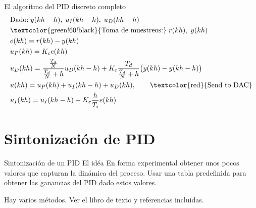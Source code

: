 \documentclass[presentation,aspectratio=1610]{beamer}
\begin{document}
\begin{frame}[label={sec:org34749bc}]{El algoritmo del PID discreto completo}
\begin{align*}
&\text{Dado:}  \;  y(kh-h), \; u_I(kh-h), \; u_D(kh-h)\\
& \text{\textcolor{green!60!black}{Toma de muestreos:}} \; r(kh), \; y(kh)\\
&e(kh) = r(kh) - y(kh)\\
&u_P(kh) = K_ce(kh)\\
&u_D(kh) = \frac{\frac{T_d}{N}}{\frac{T_d}{N} + h}u_D(kh-h) + K_c\frac{T_d}{\frac{T_d}{N} + h}\big(y(kh) - y(kh-h)\big)\\
&u(kh) = u_P(kh) + u_I(kh-h) + u_D(kh), \qquad \text{\textcolor{red}{Send to DAC}}\\
&u_I(kh) = u_I(kh-h) + K_c \frac{h}{T_i} e(kh)
\end{align*}

\begin{center}
\end{center}
\end{frame}

\section{Sintonización de PID}
\label{sec:org935e007}
\begin{frame}[label={sec:orgaefa60b}]{Sintonización de un PID}
\alert{El idéa} En forma experimental obtener unos pocos valores que capturan la dinámica del proceso. Usar una tabla predefinida para obtener las ganancias del PID dado estos valores.

Hay varios métodos. Ver el libro de texto y referencias incluidas.
\end{frame}
\end{document}

